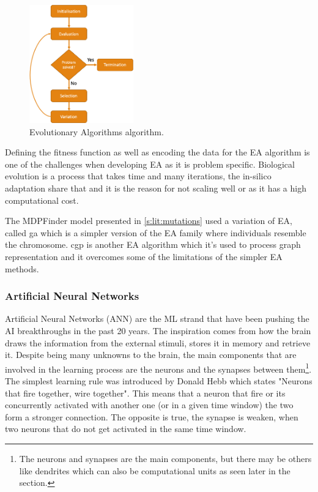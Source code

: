 \begin{figure}[!htb]
  \centering\includegraphics[width=0.4\textwidth,height=0.4\textheight,keepaspectratio]{Sections/Lit_review/Resources/EA_basic.png}
    \caption{Evolutionary Algorithms algorithm.}
    \label{fig:ea_basic}
\end{figure}
\FloatBarrier


Defining the fitness function as well as encoding the data for the EA algorithm is one of the challenges when developing EA as it is problem specific. Biological evolution is a process that takes time and many iterations, the in-silico adaptation share that and it is the reason for not scaling well or as it has a high computational cost.

The MDPFinder model presented in \cref{s:lit:mutations} used a variation of EA, called \acrfull{ga} which is a simpler version of the EA family where individuals resemble the chromosome. \acrfull{cgp} is another EA algorithm which it's used to process graph representation and it overcomes some of the limitations of the simpler EA methods. 


\subsubsection{Artificial Neural Networks} \label{s:lit:ann_overview}

Artificial Neural Networks (ANN) are the ML strand that have been pushing the AI breakthroughs in the past 20 years. The inspiration comes from how the brain draws the information from the external stimuli, stores it in memory and retrieve it. Despite being many unknowns to the brain, the main components that are involved in the learning process are the neurons and the synapses between them\footnote{The neurons and synapses are the main components, but there may be others like dendrites which can also be computational units as seen later in the section.}. The simplest learning rule was introduced by Donald Hebb which states "Neurons that fire together, wire together"\cite{Hebb_Donald1949-nn}. This means that a neuron that fire or its concurrently activated with another one (or in a given time window) the two form a stronger connection. The opposite is true, the synapse is weaken, when two neurons that do not get activated in the same time window.

